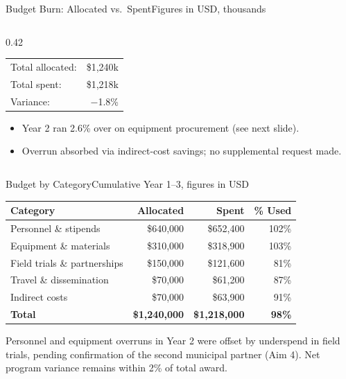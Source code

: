 \begin{frame}{Budget Burn: Allocated vs.\ Spent}{Figures in USD, thousands}
\begin{columns}[T,onlytextwidth]
\begin{column}{0.42\textwidth}
\footnotesize
\begin{tcolorbox}[infobox, title=3-Year Summary]
\begin{tabular}{@{}lr@{}}
Total allocated: & \$1,240k \\
Total spent: & \$1,218k \\
Variance: & \textcolor{sage}{$-$1.8\%} \\
\end{tabular}
\end{tcolorbox}
\par\vspace{5pt}
\begin{tcolorbox}[infobox, title=Reading the Chart]
\begin{itemize}[leftmargin=*, itemsep=1pt, topsep=1pt, parsep=0pt]
  \item Year 2 ran 2.6\% over on equipment procurement (see next slide).
  \item Overrun absorbed via indirect-cost savings; no supplemental request made.
\end{itemize}
\end{tcolorbox}
\end{column}
\end{columns}
\end{frame}

\begin{frame}{Budget by Category}{Cumulative Year 1--3, figures in USD}
\small
\renewcommand{\arraystretch}{1.1}
\begin{tabular}{@{}lrrr@{}}
\toprule
\textbf{Category} & \textbf{Allocated} & \textbf{Spent} & \textbf{\% Used} \\
\midrule
Personnel \& stipends & \$640,000 & \$652,400 & 102\% \\
\rowcolor{mist}
Equipment \& materials & \$310,000 & \$318,900 & 103\% \\
Field trials \& partnerships & \$150,000 & \$121,600 & 81\% \\
\rowcolor{mist}
Travel \& dissemination & \$70,000 & \$61,200 & 87\% \\
Indirect costs & \$70,000 & \$63,900 & 91\% \\
\midrule
\textbf{Total} & \textbf{\$1,240,000} & \textbf{\$1,218,000} & \textbf{98\%} \\
\bottomrule
\end{tabular}

\par\vspace{6pt}
\begin{tcolorbox}[infobox, title=Note]
\footnotesize
Personnel and equipment overruns in Year 2 were offset by underspend in
field trials, pending confirmation of the second municipal partner
(Aim 4). Net program variance remains within 2\% of total award.
\end{tcolorbox}
\end{frame}
